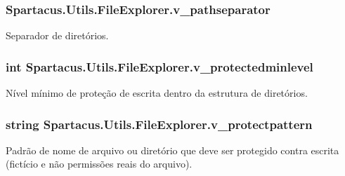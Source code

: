 \hypertarget{classSpartacus_1_1Utils_1_1FileExplorer_a566ec72c60a0ddb78eec41f208237d61}{
\subsubsection[{v\+\_\+pathseparator}]{ Spartacus.\+Utils.\+File\+Explorer.\+v\+\_\+pathseparator}}\label{classSpartacus_1_1Utils_1_1FileExplorer_a566ec72c60a0ddb78eec41f208237d61}


Separador de diretórios. 

\hypertarget{classSpartacus_1_1Utils_1_1FileExplorer_a471c35d5854d9f4dbf605da187f262b1}{
\subsubsection[{v\+\_\+protectedminlevel}]{\setlength{\rightskip}{0pt plus 5cm}int Spartacus.\+Utils.\+File\+Explorer.\+v\+\_\+protectedminlevel}}\label{classSpartacus_1_1Utils_1_1FileExplorer_a471c35d5854d9f4dbf605da187f262b1}


Nível mínimo de proteção de escrita dentro da estrutura de diretórios. 

\hypertarget{classSpartacus_1_1Utils_1_1FileExplorer_a1e0f31dd0c66b2a6d5003a0ace555eab}{
\subsubsection[{v\+\_\+protectpattern}]{\setlength{\rightskip}{0pt plus 5cm}string Spartacus.\+Utils.\+File\+Explorer.\+v\+\_\+protectpattern}}\label{classSpartacus_1_1Utils_1_1FileExplorer_a1e0f31dd0c66b2a6d5003a0ace555eab}


Padrão de nome de arquivo ou diretório que deve ser protegido contra escrita (fictício e não permissões reais do arquivo). 

